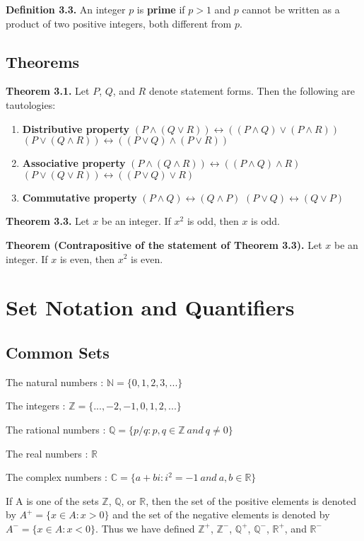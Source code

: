 \documentclass{article}
\begin{document}
\textbf{Definition 3.3.} An integer $p$ is \textbf{prime} if $p > 1$ and $p$ cannot be written as a product of two positive integers, both different from $p$.


\subsection{Theorems}
\textbf{Theorem 3.1.} Let $P$, $Q$, and $R$ denote statement forms. Then the following are tautologies:
\begin{enumerate}
	\item \textbf{Distributive property}
		\subitem  $(P \land (Q \lor R)) \leftrightarrow ((P \land Q) \lor (P \land R))$
		\subitem  $(P \lor (Q \land R)) \leftrightarrow ((P \lor Q) \land (P \lor R))$
	\item \textbf{Associative property}
		\subitem $(P \land (Q \land R)) \leftrightarrow ((P \land Q) \land R)$
		\subitem $(P \lor (Q \lor R)) \leftrightarrow ((P \lor Q) \lor R)$

	\item \textbf{Commutative property}
		\subitem  $(P \land Q) \leftrightarrow (Q \land P)$
		\subitem  $(P \lor Q) \leftrightarrow (Q \lor P)$
\end{enumerate} 

\textbf{Theorem 3.3.} Let $x$ be an integer. If $x^2$ is odd, then $x$ is odd.

\textbf{Theorem (Contrapositive of the statement of Theorem 3.3).} Let $x$ be an integer. If $x$ is even, then $x^2$ is even.


\section{Set Notation and Quantifiers}
\subsection{Common Sets}
The natural numbers : $\mathbb{N} = \{0,1,2,3,...\}$

The integers : $\mathbb{Z} = \{...,-2,-1,0,1,2,...\}$

The rational numbers : $\mathbb{Q} = \{p/q : p,q \in \mathbb{Z}\ and\ q \neq 0 \}$

The real numbers : $\mathbb{R}$

The complex numbers : $\mathbb{C} = \{a + bi : i^2 = -1 \ and \ a,b \in \mathbb{R}\}$

If A is one of the sets $\mathbb{Z}$, $\mathbb{Q}$, or $\mathbb{R}$, then the set of the positive elements is denoted by $A^+ = \{x \in A : x > 0 \}$ and the set of the negative elements is denoted by $A^- = \{x \in A : x < 0 \}$. Thus we have defined $\mathbb{Z}^+$, $\mathbb{Z}^-$, $\mathbb{Q}^+$, $\mathbb{Q}^-$, $\mathbb{R}^+$, and $\mathbb{R}^-$
\end{document}
